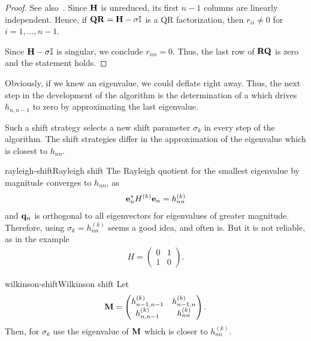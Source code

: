\begin{proof}
  See also~\cite[Theorem 7.5.1]{GolubVanLoan83}.  Since $\mathbf H$ is
  unreduced, its first $n-1$ columns are linearly independent. Hence,
  if $\mathbf Q\mathbf R=\mathbf H-\sigma\mathbb I$ is a QR factorization, then
  $r_{ii} \neq 0$ for $i=1,\dots,n-1$.

  Since $\mathbf H-\sigma\mathbb I$ is singular, we conclude $r_{nn}=0$. Thus,
  the last row of $\mathbf R\mathbf Q$ is zero and the statement holds.
\end{proof}

\begin{intro}
  Obviously, if we knew an eigenvalue, we could deflate right
  away. Thus, the next step in the development of the algorithm is the
  determination of a  which drives $h_{n,n-1}$
  to zero by approximating the last eigenvalue.

  Such a shift strategy selects a new shift parameter $\sigma_k$ in
  every step of the algorithm. The shift strategies differ in the
  approximation of the eigenvalue which is closest to $h_{nn}$.
\end{intro}

\begin{Example*}{rayleigh-shift}{Rayleigh shift}
  The Rayleigh quotient for the smallest eigenvalue by magnitude
  converges to $h_{nn}$, as
  \begin{gather}
    \mathbf e_n^* H^{(k)} \mathbf e_n = h_{nn}^{(k)}
  \end{gather}
  and $\mathbf q_n$ is orthogonal to all eigenvectors for eigenvalues of
  greater magnitude. Therefore, using $\sigma_k = h_{nn}^{(k)}$ seems
  a good idea, and often is. But it is not reliable, as in the example
  \begin{gather}
    H =
    \begin{pmatrix}
      0 & 1 \\ 1 & 0
    \end{pmatrix}.
  \end{gather}
\end{Example*}

\begin{Definition*}{wilkinson-shift}{Wilkinson shift}
  Let
  \begin{gather}
    \mathbf M =
    \begin{pmatrix}
      h_{n-1,n-1}^{(k)}&h_{n-1,n}^{(k)}\\h_{n,n-1}^{(k)}&h_{nn}^{(k)}
    \end{pmatrix}.
  \end{gather}
  Then, for $\sigma_k$ use the eigenvalue of $\mathbf M$ which is closer
  to $h_{nn}^{(k)}$.
\end{Definition*}

